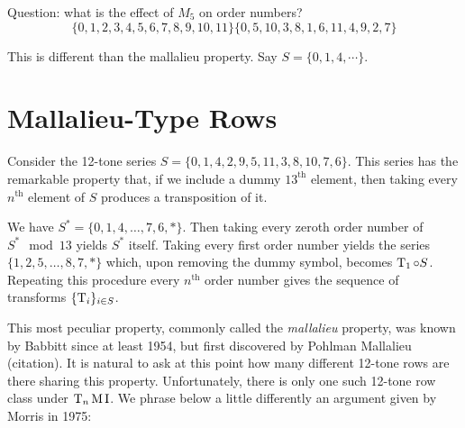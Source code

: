 Question: what is the effect of $M_5$ on order numbers?
$$
\{ 0, 1, 2, 3, 4, 5, 6, 7, 8, 9, 10, 11 \}
\{ 0, 5, 10, 3, 8, 1, 6, 11, 4, 9, 2, 7 \}
$$

This is different than the mallalieu property. Say $S = \{ 0, 1, 4, \cdots \}$.


\section{Mallalieu-Type Rows}

Consider the 12-tone series $S = \{ 0, 1, 4, 2, 9, 5, 11, 3, 8, 10, 7, 6 \}$. This series
has the remarkable property that, if we include a dummy $13^\text{th}$ element, then
taking every $n^\text{th}$ element of $S$ produces a transposition of it.

\begin{example}
	We have $S^* = \{ 0, 1, 4, \dots, 7, 6, * \}$. Then taking every zeroth order number of
	$S^* \mod 13$ yields $S^*$ itself. Taking every first order number yields the series
	$\{ 1, 2, 5, \dots, 8, 7, * \}$ which, upon removing the dummy symbol, becomes
	$\operatorname{T}_1 \circ S$. Repeating this procedure every $n^\text{th}$ order number gives the
	sequence of transforms $\{ \operatorname{T}_i \}_{i \in S}$.
\end{example}

This most peculiar property, commonly called the \emph{mallalieu} property, was known
by Babbitt since at least 1954, but first discovered by Pohlman Mallalieu (citation).
It is natural to ask at this point how many different 12-tone rows are there sharing
this property. Unfortunately, there is only one such 12-tone row class under $\operatorname{T}_n\operatorname{M}\operatorname{I}$.
We phrase below a little differently an argument given by Morris in 1975:

